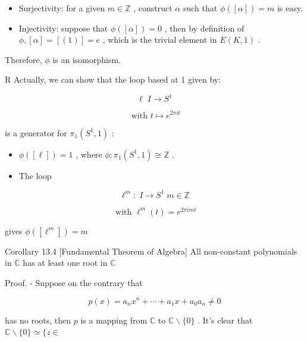 \begin{itemize}
\item Surjectivity: for a given \(m \in  \mathbb{Z}\) , construct \(\alpha\) such that \(\phi \left( \left\lbrack  \alpha \right\rbrack  \right)  = m\) is easy.
\end{itemize}

\begin{itemize}
\item Injectivity: suppose that \(\phi \left( \left\lbrack  \alpha \right\rbrack  \right)  = 0\) , then by definition of \(\phi ,\left\lbrack  \alpha \right\rbrack   = \left\lbrack  \left( 1\right) \right\rbrack   = e\) , which is the trivial element in \(E\left( {K,1}\right)\) .
\end{itemize}

Therefore, \(\phi\) is an isomorphism.

R Actually, we can show that the loop based at 1 given by:

\[
\ell \;I \rightarrow  {S}^{1}
\]

\[
\text{ with }t \mapsto  {e}^{2\pi it}
\]

is a generator for \({\pi }_{1}\left( {{S}^{1},1}\right)\) :

\begin{itemize}
\item \(\phi \left( \left\lbrack  \ell \right\rbrack  \right)  = 1\) , where \(\phi  : {\pi }_{1}\left( {{S}^{1},1}\right)  \cong  \mathbb{Z}\) .
\end{itemize}

\begin{itemize}
\item The loop
\end{itemize}

\[
{\ell }^{m} : \;I \rightarrow  {S}^{1}\;m \in  \mathbb{Z}
\]

\[
\text{ with }{\ell }^{m}\left( t\right)  = {e}^{2\pi imt}
\]

gives \(\phi \left( \left\lbrack  {\ell }^{m}\right\rbrack  \right)  = m\)

Corollary 13.4 [Fundamental Theorem of Algebra] All non-constant polynomials in \(\mathbb{C}\) has at least one root in \(\mathbb{C}\)

Proof. - Suppose on the contrary that

\[
p\left( x\right)  = {a}_{n}{x}^{n} + \cdots  + {a}_{1}x + {a}_{0}{a}_{n} \neq  0
\]

has no roots, then \(p\) is a mapping from \(\mathbb{C}\) to \(\mathbb{C} \smallsetminus  \{ 0\}\) . It’s clear that \(\mathbb{C} \smallsetminus  \{ 0\}  \simeq  \{ z \in\)

